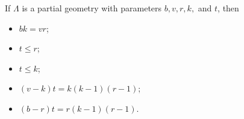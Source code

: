 If $\Lambda$ is a partial geometry with parameters $b, v, r, k,$ and $t$, then
\begin{itemize}
\item[(a)] $bk = vr$;
\item[(b)] $t \leq r$;
\item[(c)] $t \leq k$;
\item[(d)] $(v - k)t = k(k - 1)(r - 1)$;
\item[(e)] $(b - r)t = r(k - 1)(r - 1)$.
\end{itemize}
